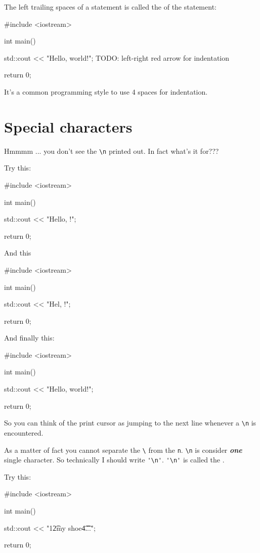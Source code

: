 The left trailing spaces of a statement is called the 
of the statement:
\begin{console}
#include <iostream>

int main()
{
    std::cout << "Hello, world!\n";
    TODO: left-right red arrow for indentation
 
    return 0;
}
\end{console}
It's a common programming style to use 4 spaces for indentation. 








\newpage\section{Special characters}


Hmmmm ... you don't see the \verb!\n! printed out. In fact what's it for???

Try this:
\begin{console}
#include <iostream>

int main()
{
    std::cout << "Hello, \nworld!\n";

    return 0;
}
\end{console}
And this
\begin{console}
#include <iostream>

int main()
{
    std::cout << "Hel\nlo, \nworld!\n";

    return 0;
}
\end{console}
And finally this:
\begin{console}
#include <iostream>

int main()
{
    std::cout << "Hello, world!";

    return 0;
}
\end{console} 
So you can think of the print cursor as jumping to the next line whenever a 
\verb!\n! is encountered. 

As a matter of fact you cannot separate the 
\verb!\! from the \verb!n!. 
\verb!\n! is consider \textit{\textbf{one}} single character. 
So technically I should write \verb!'\n'!. 
\verb!'\n'! is called the 
.







Try this:
\begin{console}
#include <iostream>

int main()
{
    std::cout << "1\t2\tbuckle my shoe\t4\t...\n";

    return 0;
}
\end{console}

